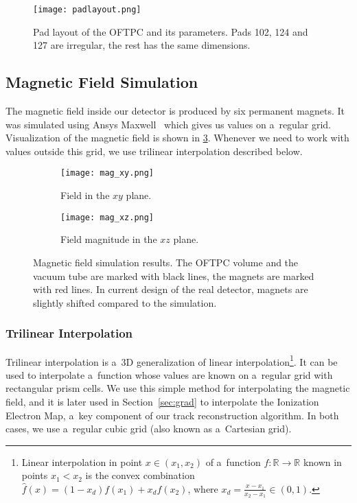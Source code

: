 				\begin{figure}[H]
					\centering
					\texttt{[image: padlayout.png]}
					\caption{Pad layout of the \ac{OFTPC} and its parameters. Pads 102, 124 and 127 are irregular, the rest has the same dimensions.}
					\label{fig:padlayout}
				\end{figure}
		
		\subsection{Magnetic Field Simulation}
		\label{sec:mag}
			The magnetic field inside our detector is produced by six permanent magnets. It was simulated using Ansys Maxwell~\cite{ansys_maxwell} which gives us values on a~regular grid. Visualization of the magnetic field is shown in \cref{fig:mag}. Whenever we need to work with values outside this grid, we use trilinear interpolation described below.
			
			\begin{figure}
				\centering
				\begin{subfigure}[t]{0.45\textwidth}
					\centering
					\texttt{[image: mag\_xy.png]}
					\caption{Field in the $xy$ plane.}
				\end{subfigure}
				\hfill
				\begin{subfigure}[t]{0.45\textwidth}
					\centering
					\texttt{[image: mag\_xz.png]}
					\caption{Field magnitude in the $xz$ plane.}
					\label{fig:mag_xz}
				\end{subfigure}
				\caption{Magnetic field simulation results. The \ac{OFTPC} volume and the vacuum tube are marked with black lines, the magnets are marked with red lines. In current design of the real detector, magnets are slightly shifted compared to the simulation.}
				\label{fig:mag}
			\end{figure}
		
			\subsubsection{Trilinear Interpolation}
			\label{sec:trilin}
				Trilinear interpolation is a~3D generalization of linear interpolation\footnote{Linear interpolation in point $x\in(x_1,x_2)$ of a~function $f\colon\mathbb{R}\to\mathbb{R}$ known in points $x_1 < x_2$ is the convex combination $\widehat{f}(x) = (1-x_d)f(x_1)+x_d f(x_2)$, where $x_d = \frac{x-x_1}{x_2-x_1} \in (0,1)$.}. It can be used to interpolate a~function whose values are known on a~regular grid with rectangular prism cells. We use this simple method for interpolating the magnetic field, and it is later used in Section~\ref{sec:grad} to interpolate the Ionization Electron Map, a~key component of our track reconstruction algorithm. In both cases, we use a~regular cubic grid (also known as a~Cartesian grid).
				
